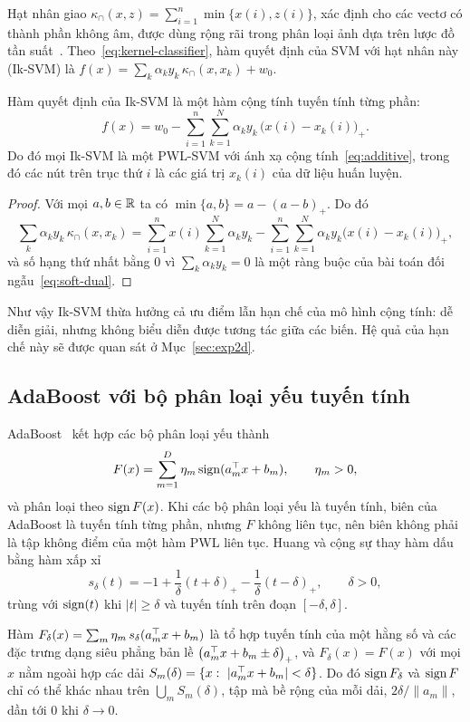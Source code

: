 Hạt nhân giao $\kappa_\cap(x,z)=\sum_{i=1}^{n}\min\{x(i),z(i)\}$, xác định cho các vectơ có thành phần không âm, được dùng rộng rãi trong phân loại ảnh dựa trên lược đồ tần suất~\cite{maji2008}. Theo~\eqref{eq:kernel-classifier}, hàm quyết định của SVM với hạt nhân này (Ik-SVM) là $f(x)=\sum_k\alpha_ky_k\,\kappa_\cap(x,x_k)+w_0$.

\begin{proposition}\label{prop:iksvm}
Hàm quyết định của Ik-SVM là một hàm cộng tính tuyến tính từng phần:
\begin{equation}\label{eq:iksvm}
f(x)=w_0-\sum_{i=1}^{n}\sum_{k=1}^{N}\alpha_ky_k\,\bigl(x(i)-x_k(i)\bigr)_+ .
\end{equation}
Do đó mọi Ik-SVM là một PWL-SVM với ánh xạ cộng tính~\eqref{eq:additive}, trong đó các nút trên trục thứ $i$ là các giá trị $x_k(i)$ của dữ liệu huấn luyện.
\end{proposition}

\begin{proof}
Với mọi $a,b\in\mathbb{R}$ ta có $\min\{a,b\}=a-(a-b)_+$. Do đó
\[
\sum_k\alpha_ky_k\,\kappa_\cap(x,x_k)=\sum_{i=1}^{n}x(i)\sum_{k=1}^{N}\alpha_ky_k-\sum_{i=1}^{n}\sum_{k=1}^{N}\alpha_ky_k\bigl(x(i)-x_k(i)\bigr)_+ ,
\]
và số hạng thứ nhất bằng $0$ vì $\sum_k\alpha_ky_k=0$ là một ràng buộc của bài toán đối ngẫu~\eqref{eq:soft-dual}.
\end{proof}

Như vậy Ik-SVM thừa hưởng cả ưu điểm lẫn hạn chế của mô hình cộng tính: dễ diễn giải, nhưng không biểu diễn được tương tác giữa các biến. Hệ quả của hạn chế này sẽ được quan sát ở Mục~\ref{sec:exp2d}.

\subsection{AdaBoost với bộ phân loại yếu tuyến tính}

AdaBoost~\cite{freund1995} kết hợp các bộ phân loại yếu thành
\[
F(x)=\sum_{m=1}^{D}\eta_m\operatorname{sign}(a_m^\top x+b_m),\qquad \eta_m>0,
\]
và phân loại theo $\operatorname{sign} F(x)$. Khi các bộ phân loại yếu là tuyến tính, biên của AdaBoost là tuyến tính từng phần, nhưng $F$ không liên tục, nên biên không phải là tập không điểm của một hàm PWL liên tục. Huang và cộng sự thay hàm dấu bằng hàm xấp xỉ
\[
s_\delta(t)=-1+\frac1\delta(t+\delta)_+-\frac1\delta(t-\delta)_+,\qquad\delta>0,
\]
trùng với $\operatorname{sign}(t)$ khi $|t|\ge\delta$ và tuyến tính trên đoạn $[-\delta,\delta]$.

\begin{proposition}\label{prop:adaboost}
Hàm $F_\delta(x)=\sum_m\eta_m\,s_\delta(a_m^\top x+b_m)$ là tổ hợp tuyến tính của một hằng số và các đặc trưng dạng siêu phẳng bản lề $\bigl(a_m^\top x+b_m\pm\delta\bigr)_+$, và $F_\delta(x)=F(x)$ với mọi $x$ nằm ngoài hợp các dải $S_m(\delta)=\{x:\ |a_m^\T x+b_m|<\delta\}$. Do đó $\operatorname{sign} F_\delta$ và $\operatorname{sign} F$ chỉ có thể khác nhau trên $\bigcup_mS_m(\delta)$, tập mà bề rộng của mỗi dải, $2\delta/\|a_m\|$, dần tới $0$ khi $\delta\to0$.
\end{proposition}

